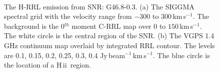 \documentclass[manuscript]{aastex61}
\newcommand{\hii}{{\rm H\,}{{\sc ii}}}
\newcommand{\kms}{\,km\,s$^{-1}$}
\begin{document}
\begin{figure}[H]
\centering
{}
\\
\caption{The H-RRL emission from SNR: G46.8-0.3.
          (a) The SIGGMA spectral grid with the velocity range from $-300$ to $300$\kms.
	  The background is the 0$^{th}$ moment C-RRL map over $0$ to $150$\kms.
	  The white circle is the central region of the SNR.
	  (b) The VGPS 1.4 GHz continuum map overlaid by integrated RRL contour.
	  The levels are 0.1, 0.15, 0.2, 0.25, 0.3, 0.4 Jy\,beam$^{-1}$\kms.
	  The blue circle is the location of a \hii\ region.
	  }
\label{fig_snr-g468}
\end{figure}
\end{document}
